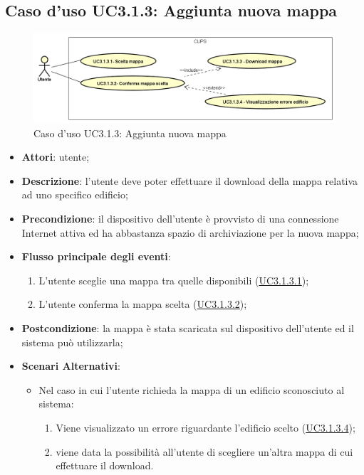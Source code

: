 \documentclass[../AnalisiDeiRequisiti.tex]{subfiles}
\begin{document}
\subsection{Caso d'uso UC3.1.3: Aggiunta nuova mappa}

        \begin{figure}[!h]
            \centering
            \includegraphics[scale=0.95, width=\textwidth]{img/UC3-1-3.png}
            \caption{Caso d'uso UC3.1.3: Aggiunta nuova mappa}\label{fig:UC3.1.3} 
        \end{figure}
\begin{itemize}
\item \textbf{Attori}: utente;
\item \textbf{Descrizione}: l'utente deve poter effettuare il download della mappa relativa ad uno specifico edificio; 
      \item \textbf{Precondizione}: il dispositivo dell'utente è provvisto di una connessione Internet attiva ed ha abbastanza spazio di archiviazione per la nuova mappa;

        \item \textbf{Flusso principale degli eventi}:
          \begin{enumerate}
          \item L'utente sceglie una mappa tra quelle disponibili (\hyperlink{UC3.1.3.1}{UC3.1.3.1});
          \item L'utente conferma la mappa scelta  (\hyperlink{UC3.1.3.2}{UC3.1.3.2});

      \end{enumerate}
    \item \textbf{Postcondizione}: la mappa è stata scaricata sul dispositivo dell'utente ed il sistema può utilizzarla;
    \item \textbf{Scenari Alternativi}:
    	\begin{itemize}
			\item Nel caso in cui l'utente richieda la mappa di un edificio sconosciuto al sistema:
			\begin{enumerate}
				\item Viene visualizzato un errore riguardante l'edificio scelto (\hyperlink{UC3.1.3.4}{UC3.1.3.4});
				\item viene data la possibilità all'utente di scegliere un'altra mappa di cui effettuare il download.
			\end{enumerate}
      	\end{itemize}
  \end{itemize}
\hypertarget{UC3.1.3.1}{}
\end{document}
